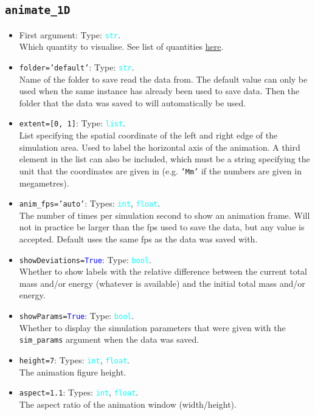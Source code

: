 \documentclass{article}
\newcommand{\ttt}[1]{\texttt{#1}}
\newcommand{\ptype}[1]{\texttt{\textcolor{cyan}{#1}}}
\newcommand{\cbl}[1]{\textcolor{blue}{#1}}
\newcommand{\cro}[1]{\textcolor{RedOrange}{#1}}
\newcommand{\cyo}[1]{\textcolor{YellowOrange}{#1}}
\begin{document}
\subsection{\ttt{animate\_1D}}
\label{sec:anim1}
\begin{itemize}
	\item First argument: Type: \ptype{str}.\\Which quantity to visualise. See list of quantities \hyperref[sec:quants]{here}.
	\item \ttt{\cro{folder}=\cyo{'default'}}: Type: \ptype{str}.\\Name of the folder to save read the data from. The default value can only be used when the same instance has already been used to save data. Then the folder that the data was saved to will automatically be used.
	\item \ttt{\cro{extent}=[0, 1]}: Type: \ptype{list}.\\List specifying the spatial coordinate of the left and right edge of the simulation area. Used to label the horizontal axis of the animation. A third element in the list can also be included, which must be a string specifying the unit that the coordinates are given in (e.g. \ttt{'Mm'} if the numbers are given in megametres).
	\item \ttt{\cro{anim\_fps}=\cyo{'auto'}}: Types: \ptype{int}, \ptype{float}.\\The number of times per simulation second to show an animation frame. Will not in practice be larger than the fps used to save the data, but any value is accepted. Default uses the same fps as the data was saved with.
	\item \ttt{\cro{showDeviations}=\cbl{True}}: Type: \ptype{bool}.\\Whether to show labels with the relative difference between the current total mass and/or energy (whatever is available) and the initial total mass and/or energy.
	\item \ttt{\cro{showParams}=\cbl{True}}: Type: \ptype{bool}.\\Whether to display the simulation parameters that were given with the \ttt{sim\_params} argument when the data was saved.
	\item \ttt{\cro{height}=7}: Types: \ptype{int}, \ptype{float}.\\The animation figure height.
	\item \ttt{\cro{aspect}=1.1}: Types: \ptype{int}, \ptype{float}.\\The aspect ratio of the animation window (width/height).

\end{itemize}
\end{document}
